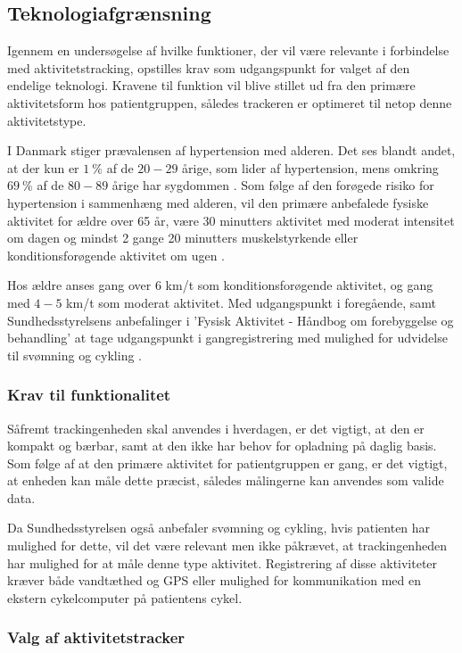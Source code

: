 \subsection{Teknologiafgrænsning}

Igennem en undersøgelse af hvilke funktioner, der vil være relevante i forbindelse med aktivitetstracking, opstilles krav som udgangspunkt for valget af den endelige teknologi. Kravene til funktion vil blive stillet ud fra den primære aktivitetsform hos patientgruppen, således trackeren er optimeret til netop denne aktivitetstype.

I Danmark stiger prævalensen af hypertension med alderen. Det ses blandt andet, at der kun er $1~\%$ af de $20-29$ årige, som lider af hypertension, mens omkring $69~\%$ af de $80-89$ årige har sygdommen \citep{olsen2015}. Som følge af den forøgede risiko for hypertension i sammenhæng med alderen, vil den primære anbefalede fysiske aktivitet for ældre over 65 år, være 30 minutters aktivitet med moderat intensitet om dagen og mindst 2 gange 20 minutters muskelstyrkende eller konditionsforøgende aktivitet om ugen \citep{pedersen2011}.

Hos ældre anses gang over $6$ km/t som konditionsforøgende aktivitet, og gang med $4-5$ km/t som moderat aktivitet. Med udgangspunkt i foregående, samt Sundhedsstyrelsens anbefalinger i 'Fysisk Aktivitet - Håndbog om forebyggelse og behandling' at tage udgangspunkt i gangregistrering med mulighed for udvidelse til svømning og cykling \citep{pedersen2011}.

\subsubsection{Krav til funktionalitet}

Såfremt trackingenheden skal anvendes i hverdagen, er det vigtigt, at den er kompakt og bærbar, samt at den ikke har behov for opladning på daglig basis. Som følge af at den primære aktivitet for patientgruppen er gang, er det vigtigt, at enheden kan måle dette præcist, således målingerne kan anvendes som valide data. 

Da Sundhedsstyrelsen også anbefaler svømning og cykling, hvis patienten har mulighed for dette, vil det være relevant men ikke påkrævet, at trackingenheden har mulighed for at måle denne type aktivitet. Registrering af disse aktiviteter kræver både vandtæthed og GPS eller mulighed for kommunikation med en ekstern cykelcomputer på patientens cykel.

\subsubsection{Valg af aktivitetstracker}

